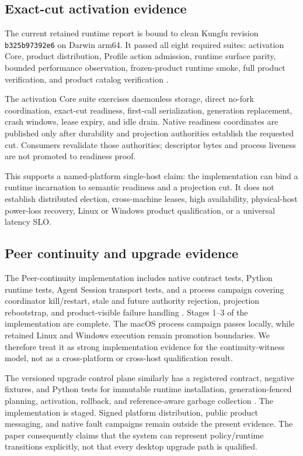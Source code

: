 \subsection{Exact-cut activation evidence}

The current retained runtime report is bound to clean Kungfu revision
\texttt{b325b97392e6} on Darwin arm64. It passed all eight required suites:
activation Core, product distribution, Profile action admission, runtime
surface parity, bounded performance observation, frozen-product runtime smoke,
full product verification, and product catalog verification
\cite{kungfu2026runtimequalification}.

The activation Core suite exercises daemonless storage, direct no-fork
coordination, exact-cut readiness, first-call serialization, generation
replacement, crash windows, lease expiry, and idle drain. Native readiness
coordinates are published only after durability and projection authorities
establish the requested cut. Consumers revalidate those authorities; descriptor
bytes and process liveness are not promoted to readiness proof.

This supports a named-platform single-host claim: the implementation can bind a
runtime incarnation to semantic readiness and a projection cut. It does not
establish distributed election, cross-machine leases, high availability,
physical-host power-loss recovery, Linux or Windows product qualification, or a
universal latency SLO.

\subsection{Peer continuity and upgrade evidence}

The Peer-continuity implementation includes native contract tests, Python
runtime tests, Agent Session transport tests, and a process campaign covering
coordinator kill/restart, stale and future authority rejection, projection
rebootstrap, and product-visible failure handling
\cite{kungfu2026peercontinuity}. Stages 1--3 of the implementation are complete.
The macOS process campaign passes locally, while retained Linux and Windows
execution remain promotion boundaries. We therefore treat it as strong
implementation evidence for the continuity-witness model, not as a
cross-platform or cross-host qualification result.

The versioned upgrade control plane similarly has a registered contract,
negative fixtures, and Python tests for immutable runtime installation,
generation-fenced planning, activation, rollback, and reference-aware garbage
collection \cite{kungfu2026upgrade}. The implementation is staged. Signed
platform distribution, public product messaging, and native fault campaigns
remain outside the present evidence. The paper consequently claims that the
system can represent policy/runtime transitions explicitly, not that every
desktop upgrade path is qualified.

